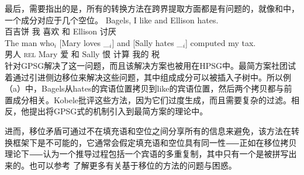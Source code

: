 最后，需要指出的是，所有的转换方法在跨界提取方面都是有问题的，就像和中，一个成分对应于几个空位。
\eal
\label{ex-atb-minimalism}
\ex\label{ex-bagels-i-like-and-ellison-hates}
\gll Bagels, I like and Ellison hates.\footnotemark\\
	百吉饼 我 喜欢 和 Ellison 讨厌\\
\ex 
\gll The          man who$_i$ [Mary loves \_$_i$] and [Sally hates \_$_i$] computed my tax.\\
      男人 \textsc{rel} Mary 爱 {} 和 Sally 恨 {} 计算 我的 税\\
\zl
 \citet{Gazdar81}针对GPSG解决了这一问题，而且该解决方案也被用在HPSG中。最简方案社团试着通过引进侧边移位来解决这些问题\citep{Nunes2004a-u}，其中组成成分可以被插入子树中。所以例（a）中，Bagels从hates的宾语位置拷贝到like的宾语位置，然后两个拷贝都与前置成分相关。Kobele批评这些方法，因为它们过度生成，而且需要复杂的过滤。相反，他提出将GPSG式的\slaschc 机制引入到最简方案的理论中\citep{Kobele2008a}。

进而，移位矛盾\citep[第2章]{Bresnan2001a}可通过不在填充语和空位之间分享所有的信息来避免，该方法在转换框架下是不可能的，它通常会假定填充语和空位具有同一性⸺正如在移位拷贝理论下⸺认为一个推导过程包括一个宾语的多重复制，其中只有一个是被拼写出来的。也可以参考 了解更多有关基于移位的方法的问题与困惑。 

